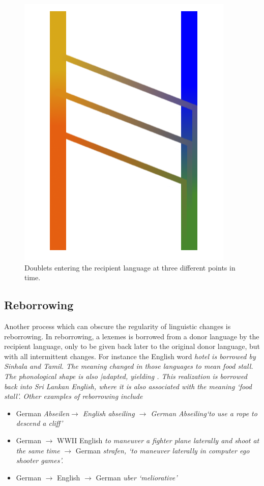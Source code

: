 \documentclass[a4paper,10pt]{article}
\begin{document}
\begin{figure}
    \includegraphics[height=.3\textheight]{triplet.png}
\caption{Doublets entering the recipient language at three different points in time.}
\label{fig:doublets}
\end{figure}


\subsection{Reborrowing}
Another process which can obscure the regularity of linguistic changes is reborrowing. In reborrowing, a lexemes is borrowed from a donor language by the recipient language, only to be given back later to the original donor language, but with all intermittent changes. For instance the English word \em hotel \em is borrowed by Sinhala and Tamil. The meaning changed in those languages to mean \em food stall\em. The phonological shape is also |adapted, yielding . This realization is borrowed back into Sri Lankan English, where it is also associated with the meaning `food stall'. Other examples of reborrowing include 

\begin{itemize}
 \item German \em Abseilen\em $\to$ English \em abseiling \em $\to$ German \em Abseiling\em `to use a rope to descend a cliff'
 \item German  $\to$ WWII English {\em to maneuver a fighter plane laterally and shoot at the same time} $\to$ German \em strafen\em,  `to maneuver laterally in computer ego shooter games'.
 \item German  $\to$ English  $\to$ German \em uber \em {} `meliorative'
\end{itemize}
\end{document}
